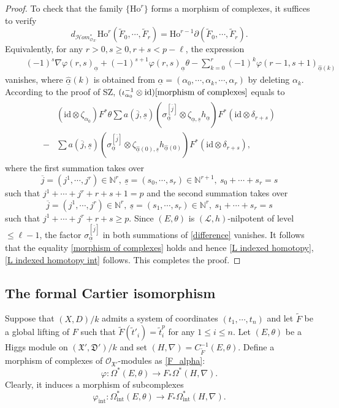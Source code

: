 \documentclass[12pt, a4paper]{article}
\begin{document}
\begin{proof}
To check that the family $\{\mathrm{Ho}^r\}$ forms a morphism of complexes, it suffices to verify 
$$
d_{\mathcal Hom^*_{\mathcal O_{X'}}}\mathrm{Ho}^r(\tilde F_0,\cdots,\tilde F_r)=\mathrm{Ho}^{r-1}\partial(\tilde F_0,\cdots,\tilde F_r).$$
Equivalently, for any $r>0,s\geq0,r+s<p-\ell$, the expression
\begin{eqnarray}\label{morphism of complexes}
\qquad(-1)^s\nabla\varphi(r,s)_{\underline\alpha}+(-1)^{s+1}\varphi(r,s)_{\underline\alpha}\theta-\sum_{k=0}^r(-1)^k\varphi(r-1,s+1)_{\hat{\underline\alpha}(k)}
\end{eqnarray}
vanishes, where $\hat{\underline\alpha}(k)$ is obtained from $\underline\alpha=(\alpha_0,\cdots,\alpha_k,\cdots,\alpha_r)$ by deleting $\alpha_k$. According to the proof of SZ, $(\iota_{\alpha_0}^{-1}\otimes\mathrm{id})\eqref{morphism of complexes}$ equals to
\begin{eqnarray}\label{difference}
\begin{array}{cl}
&(\mathrm{id}\otimes\zeta_{\alpha_0})F^*\theta\sum a(\overline j,\underline s)(\sigma_{\underline\alpha}^{[\overline j]}\otimes\zeta_{\underline\alpha,\underline s}h_{\underline\alpha})F^*(\mathrm{id}\otimes\delta_{r+s})\\
-&\sum a(\overline j,\underline s)(\sigma_{\underline\alpha}^{[\overline j]}\otimes\zeta_{\hat{\underline\alpha}(0),\underline s}h_{\hat{\underline\alpha}(0)})F^*(\mathrm{id}\otimes\delta_{r+s}),
\end{array}
\end{eqnarray}
where the first summation takes over 
$$\overline j=(j^1,\cdots,j^r)\in\mathbb N^r,~\underline s=(s_0,\cdots,s_r)\in\mathbb N^{r+1},~s_0+\cdots+s_r=s$$
 such that $j^1+\cdots+j^r+r+s+1=p$ and the second summation takes over
 $$\overline j=(j^1,\cdots,j^r)\in\mathbb N^r,~\underline s=(s_1,\cdots,s_r)\in\mathbb N^r,~s_1+\cdots+s_r=s$$
 such that $j^1+\cdots+j^r+r+s\geq p$. Since $(E,\theta)$ is $(\mathcal L,h)$-nilpotent of level $\leq\ell-1$, the factor $\sigma_{\underline\alpha}^{[\overline j]}$ in both summations of \eqref{difference} vanishes. It follows that the equality \eqref{morphism of complexes} holds and hence \eqref{L indexed homotopy}, \eqref{L indexed homotopy int} follows. This completes the proof.
\end{proof}
\subsection{The formal Cartier isomorphism}
Suppose that  $(X,D)/k$ admits a system of coordinates $(t_1,\cdots,t_n)$ and let $\tilde F$ be a global  lifting of $F$ such that $\tilde F(\tilde t'_i)=\tilde t_i^p$ for any $1\leq i\leq n$. Let $(E,\theta)$ be a Higgs module on $(\mathfrak X',\mathfrak D')/k$ and set $(H,\nabla)=C^{-1}_{\tilde F}(E,\theta)$. Define a morphism of complexes of $\mathcal O_{\mathfrak X'}$-modules as \eqref{F_alpha}:
$$
\varphi:\Omega^*(E,\theta)\to F_*\Omega^*(H,\nabla).
$$
Clearly, it induces a morphism of subcomplexes
$$
\varphi_\mathrm{int}:\Omega_\mathrm{int}^*(E,\theta)\to F_*\Omega_\mathrm{int}^*(H,\nabla).
$$
\end{document}
